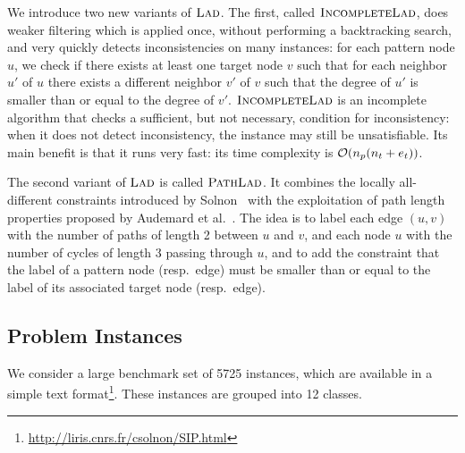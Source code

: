 \documentclass{llncs}
\newcommand{\LAD}{$\textsc{Lad}$\xspace}
\newcommand{\IncompleteLAD}{$\textsc{IncompleteLad}$\xspace}
\newcommand{\PathLAD}{$\textsc{PathLad}$\xspace}
\begin{document}
We introduce two new variants of \LAD. The first, called \IncompleteLAD, does weaker
filtering which is applied once, without performing a backtracking search, and very quickly
detects inconsistencies on many instances: for each pattern node $u$, we check
if there exists at
least one target node $v$ such that for each neighbor $u'$ of $u$ there exists a different neighbor
$v'$ of $v$ such that the degree of $u'$ is smaller than or equal to the degree of $v'$.
\IncompleteLAD is an incomplete algorithm that checks a sufficient, but not
necessary, condition for inconsistency: when it does not detect inconsistency,
the instance may still be unsatisfiable. Its main benefit is that it runs very
fast: its time complexity is ${\cal O}(n_p(n_t+e_t))$.

The second variant of \LAD is called \PathLAD. It combines the locally all-different constraints
introduced by Solnon~\cite{Solnon:2010} with the exploitation of path length properties proposed by
Audemard et al.~\cite{Audemard:2014}. The idea is to label each edge $(u,v)$ with the number of
paths of length 2 between $u$ and $v$, and each node $u$ with the number of cycles of length 3
passing through $u$, and to add the constraint that the label of a pattern node (resp.\ edge) must
be smaller than or equal to the label of its associated target node (resp.\ edge).


\subsection{Problem Instances}

We consider a large benchmark set of 5725 instances, which are available in a simple text
format\footnote{\url{http://liris.cnrs.fr/csolnon/SIP.html}}. These instances are grouped into 12
classes.
\end{document}
